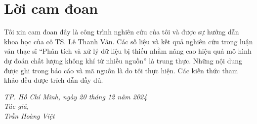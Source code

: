 \chapter*{Lời cam đoan}
Tôi xin cam đoan đây là công trình nghiên cứu của tôi và được sự hướng dẫn khoa học của cô TS. Lê Thanh Vân. Các số liệu và kết quả nghiên cứu trong luận văn thạc sĩ ``Phân tích và xử lý dữ liệu bị thiếu nhằm nâng cao hiệu quả mô hình dự đoán chất lượng không khí từ nhiều nguồn'' là trung thực. Những nội dung được ghi trong báo cáo và mã nguồn là do tôi thực hiện. Các kiến thức tham khảo đều được trích dẫn đầy đủ.
\begin{flushright}
\textit{
TP. Hồ Chí Minh, ngày 20 tháng 12 năm 2024\\
Tác giả,\\
Trần Hoàng Việt
}
\end{flushright}